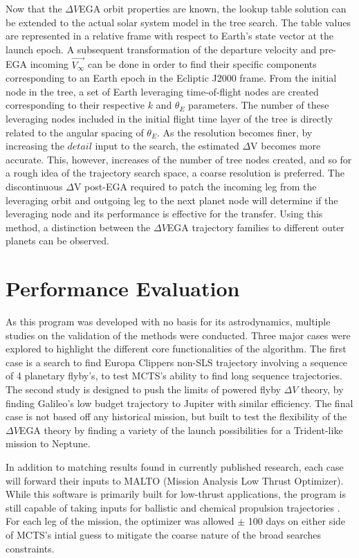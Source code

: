 \documentclass[letterpaper, preprint, paper,11pt]{AAS}	%
\begin{document}
Now that the $\Delta V$EGA orbit properties are known, the lookup table solution can be extended to the actual solar system model in the tree search. The table values are represented in a relative frame with respect to Earth's state vector at the launch epoch. A subsequent transformation of the departure velocity and pre-EGA incoming $\vec{V_\infty}$ can be done in order to find their specific components corresponding to an Earth epoch in the Ecliptic J2000 frame. From the initial node in the tree, a set of Earth leveraging time-of-flight nodes are created corresponding to their respective $k$ and $\theta_E$ parameters. The number of these leveraging nodes included in the initial flight time layer of the tree is directly related to the angular spacing of $\theta_E$. As the resolution becomes finer, by increasing the $\textit{detail}$ input to the search, the estimated $\Delta$V becomes more accurate. This, however, increases of the number of tree nodes created, and so for a rough idea of the trajectory search space, a coarse resolution is preferred. The discontinuous $\Delta$V post-EGA required to patch the incoming leg from the leveraging orbit and outgoing leg to the next planet node will determine if the leveraging node and its performance is effective for the transfer. Using this method, a distinction between the $\Delta V$EGA trajectory families to different outer planets can be observed.

\section{Performance Evaluation}

As this program was developed with no basis for its astrodynamics, multiple studies on the validation of the methods were conducted. Three major cases were explored to highlight the different core functionalities of the algorithm. The first case is a search to find Europa Clippers non-SLS trajectory involving a sequence of 4 planetary flyby's, to test MCTS's ability to find long sequence trajectories. The second study is designed to push the limits of powered flyby $\Delta V$ theory, by finding Galileo's low budget trajectory to Jupiter with similar efficiency. The final case is not based off any historical mission, but built to test the flexibility of the $\Delta V$EGA theory by finding a variety of the launch possibilities for a Trident-like mission to Neptune.

In addition to matching results found in currently published research, each case will forward their inputs to MALTO (Mission Analysis Low Thrust Optimizer). While this software is primarily built for low-thrust applications, the program is still capable of taking inputs for ballistic and chemical propulsion trajectories \cite{Sims2006}. For each leg of the mission, the optimizer was allowed $\pm$ 100 days on either side of MCTS's intial guess to mitigate the coarse nature of the broad searches constraints. 
\end{document}
